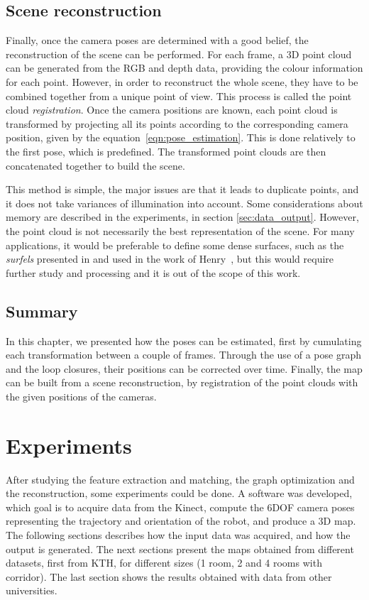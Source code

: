 \section{Scene reconstruction}

Finally, once the camera poses are determined with a good belief, the reconstruction of the scene can be performed. For each frame, a 3D point cloud can be generated from the RGB and depth data, providing the colour information for each point. However, in order to reconstruct the whole scene, they have to be combined together from a unique point of view. This process is called the point cloud \emph{registration}. Once the camera positions are known, each point cloud is transformed by projecting all its points according to the corresponding camera position, given by the equation~\ref{eqn:pose_estimation}. This is done relatively to the first pose, which is predefined. The transformed point clouds are then concatenated together to build the scene.

This method is simple, the major issues are that it leads to duplicate points, and it does not take variances of illumination into account. Some considerations about memory are described in the experiments, in section \ref{sec:data_output}. However, the point cloud is not necessarily the best representation of the scene. For many applications, it would be preferable to define some dense surfaces, such as the \emph{surfels} presented in \cite{PfisterZBG00} and used in the work of Henry~\cite{Henry_RGBD_2010}, but this would require further study and processing and it is out of the scope of this work. 

\section{Summary}

In this chapter, we presented how the poses can be estimated, first by cumulating each transformation between a couple of frames. Through the use of a pose graph and the loop closures, their positions can be corrected over time. Finally, the map can be built from a scene reconstruction, by registration of the point clouds with the given positions of the cameras.

\chapter{Experiments}
\label{chap:experiments}

After studying the feature extraction and matching, the graph optimization and the reconstruction, some experiments could be done. A software was developed, which goal is to acquire data from the Kinect, compute the 6\gls{DOF} camera poses representing the trajectory and orientation of the robot, and produce a 3D map. The following sections describes how the input data was acquired, and how the output is generated. The next sections present the maps obtained from different datasets, first from KTH, for different sizes (1 room, 2 and 4 rooms with corridor). The last section shows the results obtained with data from other universities.


